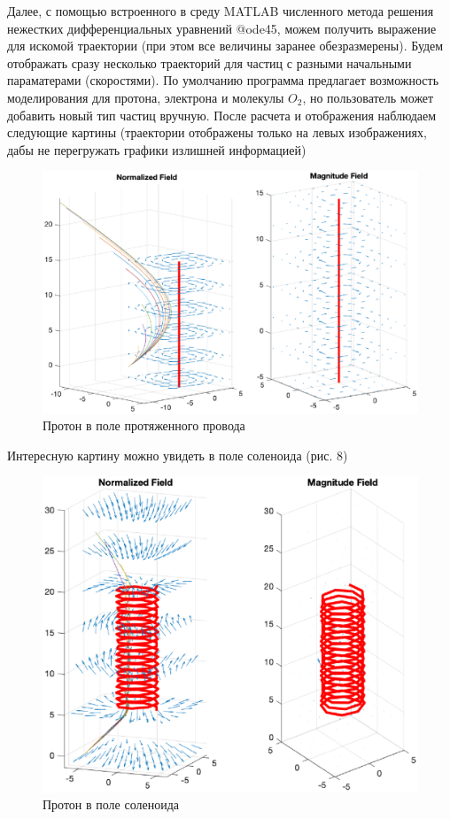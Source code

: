\documentclass[12pt,a4paper]{article}
\begin{document}
Далее, с помощью встроенного в среду MATLAB численного метода решения нежестких дифференциальных уравнений @ode45, можем получить выражение для искомой траектории (при этом все величины заранее обезразмерены). 
Будем отображать сразу несколько траекторий для частиц с разными начальными параматерами (скоростями).
По умолчанию программа предлагает возможность моделирования для протона, электрона и молекулы $O_2$, но пользователь может добавить новый тип частиц вручную.
После расчета и отображения наблюдаем следующие картины (траектории отображены только на левых изображениях, дабы не перегружать графики излишней информацией)

\begin{figure}[H]
    \centering
    \includegraphics[width=0.8\linewidth]{pics/linear+q.eps}
    \caption{Протон в поле протяженного провода}
\end{figure}

Интересную картину можно увидеть в поле соленоида (рис. 8)
\begin{figure}[H]
    \centering
    \includegraphics[width=0.85\linewidth]{pics/solenoid+q.eps}
    \caption{Протон в поле соленоида}
\end{figure}
\end{document}
